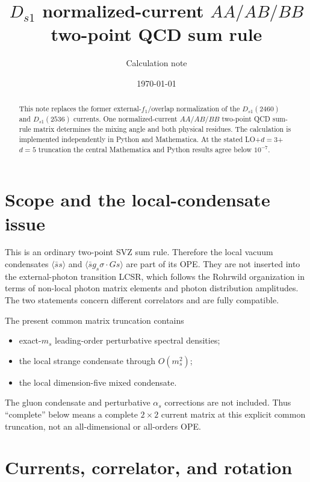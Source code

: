 \documentclass[11pt]{article}
\title{$D_{s1}$ normalized-current $AA/AB/BB$ two-point QCD sum rule}
\author{Calculation note}
\date{\today}
\begin{document}
\maketitle

\begin{abstract}
This note replaces the former external-$f_1$/overlap normalization of the
$D_{s1}(2460)$ and $D_{s1}(2536)$ currents.  One normalized-current
$AA/AB/BB$ two-point QCD sum-rule matrix determines the mixing angle and both
physical residues.  The calculation is implemented independently in Python
and Mathematica.  At the stated LO+$d=3$+$d=5$ truncation the central
Mathematica and Python results agree below $10^{-7}$.
\end{abstract}

\section{Scope and the local-condensate issue}

This is an ordinary two-point SVZ sum rule.  Therefore the local vacuum
condensates $\langle\bar ss\rangle$ and
$\langle\bar s g_s\sigma\!\cdot\!G s\rangle$ are part of its OPE.  They are
not inserted into the external-photon transition LCSR, which follows the
Rohrwild organization in terms of non-local photon matrix elements and photon
distribution amplitudes.  The two statements concern different correlators
and are fully compatible.

The present common matrix truncation contains
\begin{itemize}
  \item exact-$m_s$ leading-order perturbative spectral densities;
  \item the local strange condensate through $O(m_s^2)$;
  \item the local dimension-five mixed condensate.
\end{itemize}
The gluon condensate and perturbative $\alpha_s$ corrections are not included.
Thus ``complete'' below means a complete $2\times2$ current matrix at this
explicit common truncation, not an all-dimensional or all-orders OPE.

\section{Currents, correlator, and rotation}
\end{document}
